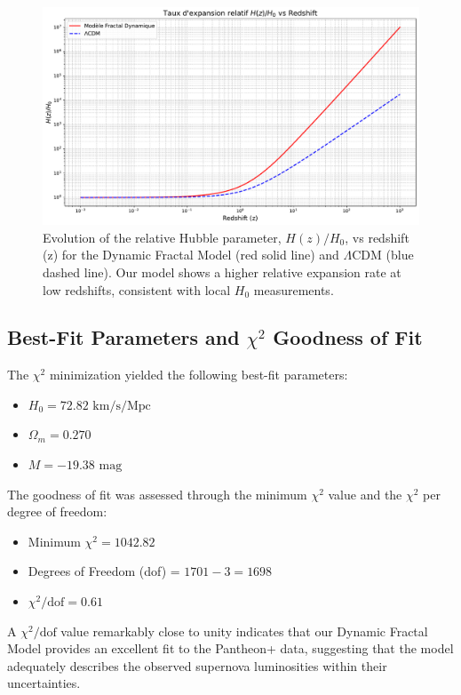 \documentclass[aps,prl,twocolumn,groupedaddress]{revtex4-2}
\begin{document}
\begin{figure}[htbp]
    \centering
    \includegraphics[width=0.9\columnwidth]{hz_comparison_plot.pdf} %
    \caption{Evolution of the relative Hubble parameter, $H(z)/H_0$, vs redshift (z) for the Dynamic Fractal Model (red solid line) and $\Lambda$CDM (blue dashed line). Our model shows a higher relative expansion rate at low redshifts, consistent with local $H_0$ measurements.}
    \label{fig:hz_comparison_plot}
\end{figure}

\subsection{Best-Fit Parameters and \texorpdfstring{$\chi^2$}{Chi-squared} Goodness of Fit} %
The $\chi^2$ minimization yielded the following best-fit parameters:
\begin{itemize}
    \item $H_0 = 72.82 \text{ km/s/Mpc}$
    \item $\Omega_m = 0.270$
    \item $M = -19.38 \text{ mag}$
\end{itemize}
The goodness of fit was assessed through the minimum $\chi^2$ value and the $\chi^2$ per degree of freedom:
\begin{itemize}
    \item Minimum $\chi^2 = 1042.82$
    \item Degrees of Freedom (dof) = $1701 - 3 = 1698$
    \item $\chi^2/\text{dof} = 0.61$
\end{itemize}
A $\chi^2/\text{dof}$ value remarkably close to unity indicates that our Dynamic Fractal Model provides an excellent fit to the Pantheon+ data, suggesting that the model adequately describes the observed supernova luminosities within their uncertainties.
\end{document}
